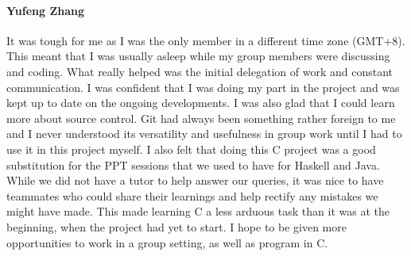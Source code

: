 \documentclass[a4paper,11pt]{article}
\begin{document}
\paragraph{Yufeng Zhang} It was tough for me as I was the only member in a different time zone (GMT+8). This meant that I was usually asleep while my group members were discussing and coding. What really helped was the initial delegation of work and constant communication. I was confident that I was doing my part in the project and was kept up to date on the ongoing developments. I was also glad that I could learn more about source control. Git had always been something rather foreign to me and I never understood its versatility and usefulness in group work until I had to use it in this project myself. I also felt that doing this C project was a good substitution for the PPT sessions that we used to have for Haskell and Java. While we did not have a tutor to help answer our queries, it was nice to have teammates who could share their learnings and help rectify any mistakes we might have made. This made learning C a less arduous task than it was at the beginning, when the project had yet to start. I hope to be given more opportunities to work in a group setting, as well as program in C.
\end{document}
